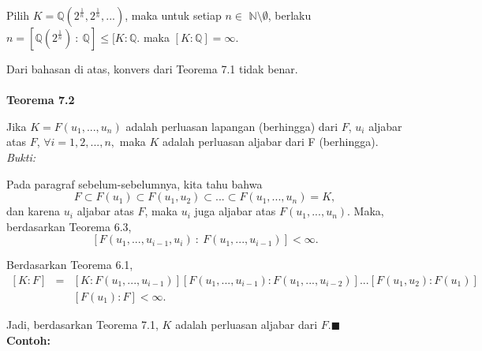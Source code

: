 \par 	Pilih $K=\mathbb{Q}(2^{\frac{1}{n}},2^{\frac{1}{n}},...)$, maka untuk setiap $n\in $
	$\mathbb{N} \setminus \emptyset $, berlaku $n=[ \mathbb{Q}(2^{\frac{1}{n}})~:~\mathbb{Q}] \le [K:\mathbb{Q}.$
	maka $[K:\mathbb{Q}] = \infty.$ 
\\
\par 	Dari bahasan di atas, konvers dari Teorema 7.1 tidak benar.
\\
\\
	\textbf{Teorema 7.2}
\par 	Jika $K=F(u_1,...,u_n)$ adalah perluasan lapangan (berhingga) dari $F$, $u_i$ aljabar atas $F$, $\forall i=1,2,...,n,$ maka $K$ adalah perluasan aljabar dari F (berhingga).
\\
	\textit{Bukti:}
\par 	Pada paragraf sebelum-sebelumnya, kita tahu bahwa $$F\subset F(u_1) \subset F(u_1,u_2)\subset...\subset F(u_1,...,u_n)=K, $$dan karena $u_i$ aljabar atas $F$, maka $u_i$ juga aljabar atas $F(u_1,...,u_n)$. Maka, berdasarkan Teorema 6.3, 
	$$[F(u_1,...,u_{i-1},u_i)~:~F(u_1,...,u_{i-1})] < \infty.$$
\par 	Berdasarkan Teorema 6.1,
	$$\begin{array}{rcl}
	[K:F] &=& [K:F(u_1,...,u_{i-1})][F(u_1,...,u_{i-1}): F(u_1,...,u_{i-2})]...[F(u_1,u_2):F(u_1)]\\
	&~&[F(u_1):F]
	< \infty.
	\end{array}$$
\par 	Jadi, berdasarkan Teorema 7.1, $K$ adalah perluasan aljabar dari $F$.$\blacksquare$
\\
	\textbf{Contoh:}
